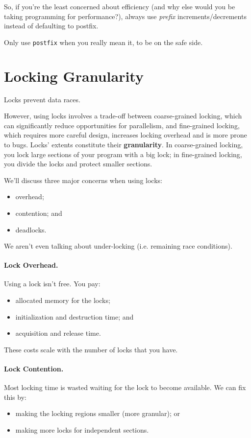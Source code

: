 So, if you're the least concerned about efficiency (and why else would you be
taking programming for performance?), always use
  \emph{prefix} increments/decrements instead of defaulting to postfix.

Only use {\tt postfix} when you really mean it, to be on the safe side.

\section*{Locking Granularity}

Locks prevent data races.

However, using locks involves a trade-off between coarse-grained
locking, which can significantly reduce opportunities for parallelism,
and fine-grained locking, which requires more careful design,
increases locking overhead and is more prone to bugs.  Locks' extents
constitute their {\bf granularity}. In coarse-grained locking, you
lock large sections of your program with a big lock; in fine-grained
locking, you divide the locks and protect smaller sections.

We'll discuss three major concerns when using locks:
  \begin{itemize}
    \item overhead;
    \item contention; and
    \item deadlocks.
  \end{itemize}
We aren't even talking about under-locking (i.e. remaining race conditions).

\paragraph{Lock Overhead.}
  Using a lock isn't free. You pay:
  \begin{itemize}
    \item allocated memory for the locks;
    \item initialization and destruction time; and
    \item acquisition and release time.
  \end{itemize}
  These costs scale with the number of locks that you have.

\paragraph{Lock Contention.}
 Most locking time is wasted waiting for the lock to become available.
We can fix this by:
      \begin{itemize}
        \item making the locking regions smaller (more granular); or
        \item making more locks for independent sections.
      \end{itemize}

